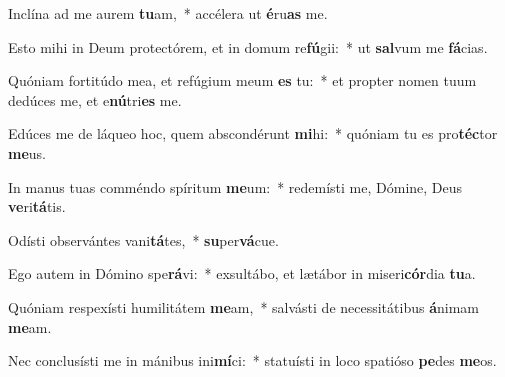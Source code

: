 \item Inclína ad me aurem \textbf{tu}am,~* accélera ut \textbf{é}ru\textbf{as} me.
\item Esto mihi in Deum protectórem, et in domum re\textbf{fú}gii:~* ut \textbf{sal}vum me \textbf{fá}cias.
\item Quóniam fortitúdo mea, et refúgium meum \textbf{es} tu:~* et propter nomen tuum dedúces me, et e\textbf{nú}tri\textbf{es} me.
\item Edúces me de láqueo hoc, quem abscondérunt \textbf{mi}hi:~* quóniam tu es pro\textbf{téc}tor \textbf{me}us.
\item In manus tuas comméndo spíritum \textbf{me}um:~* redemísti me, Dómine, Deus \textbf{ve}ri\textbf{tá}tis.
\item Odísti observántes vani\textbf{tá}tes,~* \textbf{su}per\textbf{vá}cue.
\item Ego autem in Dómino spe\textbf{rá}vi:~* exsultábo, et lætábor in miseri\textbf{cór}dia \textbf{tu}a.
\item Quóniam respexísti humilitátem \textbf{me}am,~* salvásti de necessitátibus \textbf{á}nimam \textbf{me}am.
\item Nec conclusísti me in mánibus ini\textbf{mí}ci:~* statuísti in loco spatióso \textbf{pe}des \textbf{me}os.

